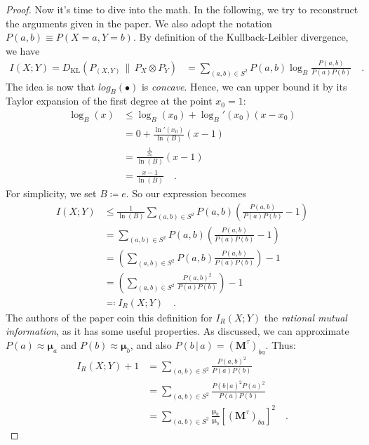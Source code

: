\documentclass[../../main.tex]{subfiles}
\begin{document}
    \bigskip \bigskip \noindent
    \begin{proof}
    Now it's time to dive into the math. In the following, we try to reconstruct the arguments given in the paper. We also adopt the notation $P (a, b) \equiv P (X = a, Y = b)$. By definition of the Kullback-Leibler divergence, we have
    \begin{align*}
        I(X; Y) = D_{\mathrm{KL}}(P_{(X, Y)} \,\|\, P_X \otimes P_Y) &= \sum_{(a,b) \in S^2} P(a, b) \log_B \frac{P(a, b)}{P(a) P(b)} \quad .
    \end{align*}
    The idea is now that $log_B(\bullet)$ is \emph{concave}. Hence, we can upper bound it by its Taylor expansion of the first degree at the point $x_0 = 1$:
    \begin{align*}
        \log_B(x) &\leq \log_B(x_0) + \log_B'(x_0) (x - x_0) \\
        &= 0 + \frac{\ln'(x_0)}{\ln(B)} (x - 1) \\
        &= \frac{\frac{1}{x_0}}{\ln(B)} (x - 1) \\
        &= \frac{x - 1}{\ln(B)} \quad .
    \end{align*}
    For simplicity, we set $B \coloneqq e$. So our expression becomes
    \begin{align*}
        I(X; Y) &\leq \frac{1}{\ln(B)}\sum_{(a,b) \in S^2} P(a, b) \left( \frac{P(a, b)}{P(a) P(b)} - 1 \right) \\
        &= \sum_{(a,b) \in S^2} P(a, b) \left( \frac{P(a, b)}{P(a) P(b)} - 1 \right) \\
        &= \left( \sum_{(a,b) \in S^2} P(a, b) \frac{P(a, b)}{P(a) P(b)} \right) - 1 \\
        &= \left( \sum_{(a,b) \in S^2} \frac{P(a, b)^2}{P(a) P(b)} \right) - 1 \\
        &\eqqcolon I_R(X; Y) \quad .
    \end{align*}
    The authors of the paper coin this definition for $I_R(X; Y)$ the \emph{rational mutual information}, as it has some useful properties. As discussed, we can approximate $P(a) \approx \boldsymbol{\mu}_a$ and $P(b) \approx \boldsymbol{\mu}_b$, and also $P(b \,|\, a) = (\boldsymbol{M}^{\tau})_{ba}$. Thus:
    \begin{align*}
        I_R(X; Y) + 1 &= \sum_{(a,b) \in S^2} \frac{P(a, b)^2}{P(a) P(b)} \\
        &= \sum_{(a,b) \in S^2} \frac{P(b \,|\, a)^2 P(a)^2}{P(a) P(b)} \\
        &= \sum_{(a,b) \in S^2} \frac{\boldsymbol{\mu}_a}{\boldsymbol{\mu}_b} \left[ (\boldsymbol{M}^{\tau})_{ba} \right] ^2 \quad .

\end{align*}
\end{proof}
\end{document}
